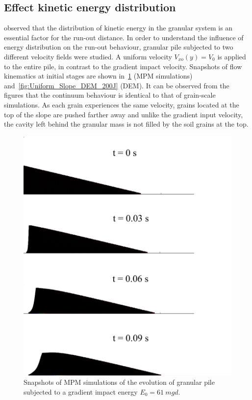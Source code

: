 \subsection*{Effect kinetic energy distribution}

\citet{Staron2005} observed that the distribution of kinetic energy in the 
granular system is an essential factor for the run-out distance. In order to 
understand the influence of energy distribution on the run-out behaviour, 
granular pile subjected to two different velocity fields were studied. A 
uniform velocity $V_{xo} (y) = V_0$ is applied to the entire pile, in contrast 
to the gradient impact velocity. Snapshots of flow kinematics at initial stages 
are shown in~\cref{fig:Uniform_Slope_Profile_200J} (MPM simulations) 
and~\cref{fig:Uniform_Slope_DEM_200J} (DEM). It can be observed from the 
figures that the continuum behaviour is identical to that of grain-scale 
simulations. As each grain experiences the same velocity, grains located at the 
top of the slope are pushed farther away and unlike the gradient input 
velocity, the cavity left behind the granular mass is not filled by the soil 
grains at the top. 
\begin{figure}[tbph]
\centering
\includegraphics[width=\textwidth]{Uniform_Slope_Profile_200J}
\caption{Snapshots of MPM simulations of the evolution of granular pile 
subjected to a gradient impact energy $E_0 = 61 \ mgd$.}
\label{fig:Uniform_Slope_Profile_200J}
\end{figure}

